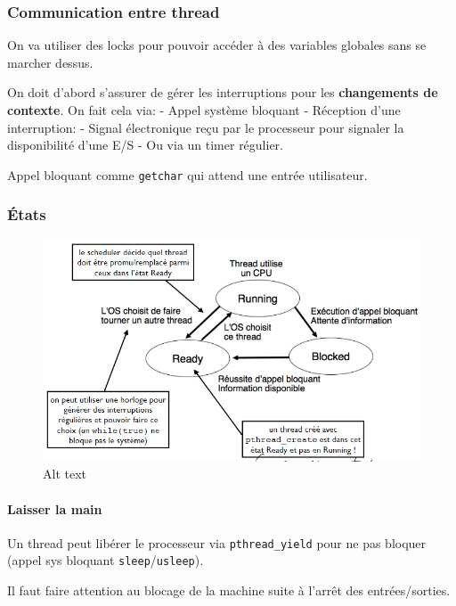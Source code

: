 \subsubsection{Communication entre
thread}\label{communication-entre-thread}

On va utiliser des locks pour pouvoir accéder à des variables globales
sans se marcher dessus.

On doit d'abord s'assurer de gérer les interruptions pour les
\textbf{changements de contexte}. On fait cela via: - Appel système
bloquant - Réception d'une interruption: - Signal électronique reçu par
le processeur pour signaler la disponibilité d'une E/S - Ou via un timer
régulier.

Appel bloquant comme \texttt{getchar} qui attend une entrée utilisateur.

\subsubsection{États}\label{uxe9tats}

\begin{figure}
\centering
\includegraphics{image-24.png}
\caption{Alt text}
\end{figure}

\paragraph{Laisser la main}\label{laisser-la-main}

Un thread peut libérer le processeur via \texttt{pthread\_yield} pour ne
pas bloquer (appel sys bloquant \texttt{sleep}/\texttt{usleep}).

Il faut faire attention au blocage de la machine suite à l'arrêt des
entrées/sorties.

